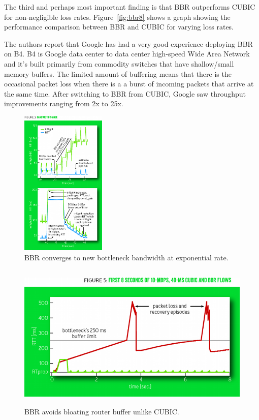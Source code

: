 The third and perhaps most important finding is that BBR outperforms CUBIC for non-negligible loss rates.
Figure~\ref{fig:bbr8} shows a graph showing the performance comparison between BBR and CUBIC
for varying loss rates.

The authors report that Google has had a very good experience deploying BBR on B4. B4 is Google  data center to
data center high-speed Wide Area Network and it's built primarily from commodity switches that have shallow/small
memory buffers. The limited amount of buffering means that there is the occasional packet loss when there is a
a burst of incoming packets that arrive at the same time. After switching to BBR from CUBIC, Google saw throughput
improvements ranging from 2x to 25x.



\begin{figure}[h]
  \centering
  \includegraphics[height=7cm]{./img/bbr_fig3.png}
  \caption{BBR converges to new bottleneck bandwidth at exponential rate.}
  \label{fig:bbr3}
\end{figure}


\begin{figure}[h]
  \centering
  \includegraphics[height=7cm]{./img/bbr_fig5.png}
  \caption{BBR avoids bloating router buffer unlike CUBIC.}
  \label{fig:bbr5}
\end{figure}




